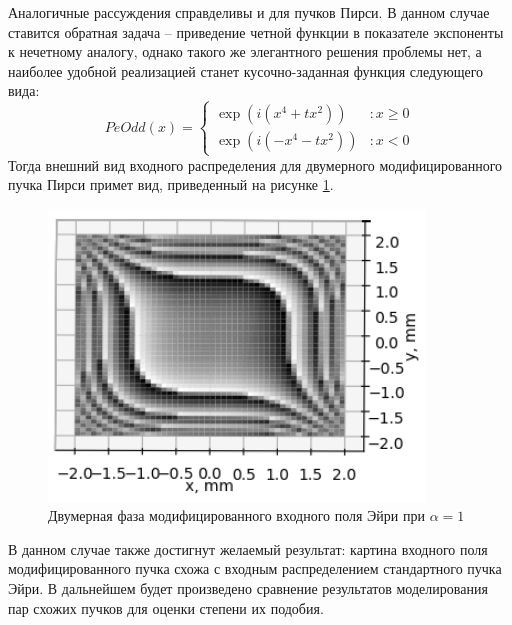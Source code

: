 {{	Аналогичные рассуждения справделивы и для пучков Пирси. В данном случае  ставится обратная задача -- приведение четной функции в показателе экспоненты к нечетному аналогу, однако такого же элегантного решения проблемы нет, а наиболее удобной реализацией станет кусочно-заданная функция следующего вида:
\[PeOdd(x) = \left\{
  \begin{array}{lr}
    \exp(i(x^4 + tx^2)) & : x \ge 0\\
 	 \exp(i(-x^4 - tx^2)) & : x < 0
  \end{array}
\right.
\]
Тогда внешний вид входного распределения для двумерного модифицированного пучка Пирси примет вид, приведенный на рисунке \ref{peodd_phase_2d}.
\begin{figure}[H]
		  \begin{center}
			\includegraphics[width=10cm]{plots/peoddphase_new}
	\caption{Двумерная фаза модифицированного входного поля Эйри при $\alpha  = 1$}
	\label{peodd_phase_2d}
		 \end{center}
\end{figure}
В данном случае также достигнут желаемый результат: картина входного поля модифицированного пучка схожа с входным распределением стандартного пучка Эйри. В дальнейшем будет произведено сравнение результатов моделирования пар схожих пучков для оценки степени их подобия. 

}
				}
				\newpage

